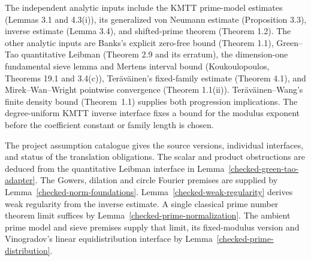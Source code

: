 \begin{proposition}\label{external-inputs}
The independent analytic inputs include the KMTT prime-model estimates
(Lemmas 3.1 and 4.3(i)), its generalized von Neumann estimate (Proposition 3.3),
inverse estimate (Lemma 3.4), and
shifted-prime theorem (Theorem 1.2). The other analytic inputs are
Banks's explicit zero-free bound (Theorem 1.1), Green--Tao quantitative
Leibman (Theorem 2.9 and its erratum), the dimension-one fundamental
sieve lemma and Mertens interval bound (Koukoulopoulos, Theorems 19.1
and 3.4(c)), Ter\"av\"ainen's fixed-family
estimate (Theorem 4.1), and
Mirek--Wan--Wright pointwise convergence (Theorem 1.1(ii)).
Ter\"av\"ainen--Wang's finite density bound
(Theorem~1.1) supplies both progression implications.
The degree-uniform KMTT inverse interface fixes a bound
for the modulus exponent before the coefficient constant or family
length is chosen.
\end{proposition}

The project assumption catalogue gives the source versions, individual
interfaces, and status of the translation obligations. The scalar
and product obstructions are deduced from the quantitative Leibman
interface in Lemma~\ref{checked-green-tao-adapter}.
The Gowers, dilation and circle Fourier premises are supplied by
Lemma~\ref{checked-norm-foundations}. Lemma~\ref{checked-weak-regularity}
derives weak regularity from the inverse estimate. A single classical prime number
theorem limit suffices by Lemma~\ref{checked-prime-normalization}.
The ambient prime model and sieve premises supply that limit, its
fixed-modulus version and Vinogradov's linear equidistribution
interface by Lemma~\ref{checked-prime-distribution}.
